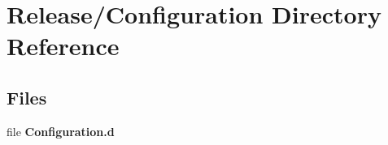 \section{Release/\+Configuration Directory Reference}
\label{dir_5d0d28870d641f3e963df4d3e48f0aae}
\subsection*{Files}
\begin{DoxyCompactItemize}
\item 
file {\bfseries Configuration.\+d}
\end{DoxyCompactItemize}
